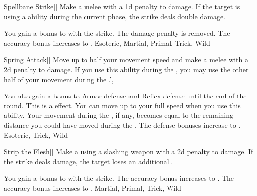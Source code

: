 \lowercase{\hypertarget{maneuver:Spellbane Strike}{}}\label{maneuver:Spellbane Strike}
\hypertarget{maneuver:Spellbane Strike}{}
\begin{freeability}[Rank 1]{Spellbane Strike}[]
Make a melee  with a \minus1d penalty to damage.
If the target is using a  ability during the current phase, the strike deals double damage.

\rankline
{} You gain a  bonus to  with the strike.
 The damage penalty is removed.
 The accuracy bonus increases to .
 Esoteric, Martial, Primal, Trick, Wild
\end{freeability}
\vspace{0.25em}



\lowercase{\hypertarget{maneuver:Spring Attack}{}}\label{maneuver:Spring Attack}
\hypertarget{maneuver:Spring Attack}{}
\begin{freeability}[Rank 1]{Spring Attack}[]
Move up to half your movement speed and make a melee  with a \minus2d penalty to damage.
If you use this ability during the , you may use the other half of your movement during the .',

\rankline
{} You also gain a  bonus to Armor defense and Reflex defense until the end of the round. This is a  effect.
 You can move up to your full speed when you use this ability.
Your movement during the , if any, becomes equal to the remaining distance you could have moved during the .
 The defense bonuses increase to .
 Esoteric, Trick, Wild
\end{freeability}
\vspace{0.25em}



\lowercase{\hypertarget{maneuver:Strip the Flesh}{}}\label{maneuver:Strip the Flesh}
\hypertarget{maneuver:Strip the Flesh}{}
\begin{freeability}[Rank 1]{Strip the Flesh}[]
Make a  using a slashing weapon with a \minus2d penalty to damage.
If the strike deals damage, the target loses an additional .

\rankline
{} You gain a  bonus to  with the strike.
 The accuracy bonus increases to .
 The accuracy bonus increases to .
 Martial, Primal, Trick, Wild
\end{freeability}
\vspace{0.25em}



